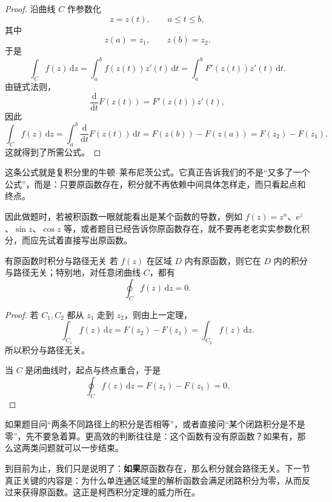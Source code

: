 \begin{proof}
沿曲线 $C$ 作参数化
\[
    z=z(t),\qquad a\le t\le b,
\]
其中
\[
    z(a)=z_1,\qquad z(b)=z_2.
\]
于是
\[
    \int_C f(z)\,\mathrm{d}z
    = \int_a^b f(z(t))z'(t)\,\mathrm{d}t
    = \int_a^b F'(z(t))z'(t)\,\mathrm{d}t.
\]
由链式法则，
\[
    \frac{\mathrm{d}}{\mathrm{d}t}F(z(t)) = F'(z(t))z'(t),
\]
因此
\[
    \int_C f(z)\,\mathrm{d}z
    = \int_a^b \frac{\mathrm{d}}{\mathrm{d}t}F(z(t))\,\mathrm{d}t
    = F(z(b))-F(z(a))
    = F(z_2)-F(z_1).
\]
这就得到了所需公式。
\end{proof}

\begin{tishi}[这条公式的意义和用法]
这条公式就是复积分里的牛顿--莱布尼茨公式。它真正告诉我们的不是``又多了一个公式''，而是：只要原函数存在，积分就不再依赖中间具体怎样走，而只看起点和终点。

因此做题时，若被积函数一眼就能看出是某个函数的导数，例如 $f(z)=z^n$、$\mathrm{e}^z$、$\sin z$、$\cos z$ 等，或者题目已经告诉你原函数存在，就不要再老老实实参数化积分，而应先试着直接写出原函数。
\end{tishi}

\begin{tuilun}{有原函数时积分与路径无关}{}
若 $f(z)$ 在区域 $D$ 内有原函数，则它在 $D$ 内的积分与路径无关；特别地，对任意闭曲线 $C$，都有
\[
    \oint_C f(z)\,\mathrm{d}z = 0.
\]
\end{tuilun}

\begin{proof}
若 $C_1,C_2$ 都从 $z_1$ 走到 $z_2$，则由上一定理，
\[
    \int_{C_1} f(z)\,\mathrm{d}z = F(z_2)-F(z_1)=\int_{C_2} f(z)\,\mathrm{d}z.
\]
所以积分与路径无关。

当 $C$ 是闭曲线时，起点与终点重合，于是
\[
    \oint_C f(z)\,\mathrm{d}z = F(z_1)-F(z_1)=0.
\]
\end{proof}

\begin{tishi}[这条推论最常怎么用]
如果题目问``两条不同路径上的积分是否相等''，或者直接问``某个闭路积分是不是零''，先不要急着算。更高效的判断往往是：这个函数有没有原函数？如果有，那么这两类问题就可以一步结束。
\end{tishi}

\begin{tishi}[这一节和下一节的关系]
到目前为止，我们只是说明了：\textbf{如果}原函数存在，那么积分就会路径无关。下一节真正关键的内容是：为什么单连通区域里的解析函数会满足闭路积分为零，从而反过来获得原函数。这正是柯西积分定理的威力所在。
\end{tishi}


